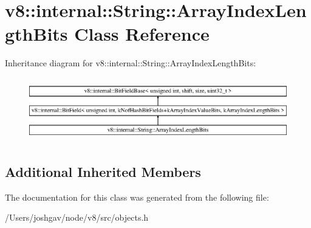\hypertarget{classv8_1_1internal_1_1_string_1_1_array_index_length_bits}{}\section{v8\+:\+:internal\+:\+:String\+:\+:Array\+Index\+Length\+Bits Class Reference}
\label{classv8_1_1internal_1_1_string_1_1_array_index_length_bits}
Inheritance diagram for v8\+:\+:internal\+:\+:String\+:\+:Array\+Index\+Length\+Bits\+:\begin{figure}[H]
\begin{center}
\leavevmode
\includegraphics[height=2.800000cm]{classv8_1_1internal_1_1_string_1_1_array_index_length_bits}
\end{center}
\end{figure}
\subsection*{Additional Inherited Members}


The documentation for this class was generated from the following file\+:\begin{DoxyCompactItemize}
\item 
/\+Users/joshgav/node/v8/src/objects.\+h\end{DoxyCompactItemize}
